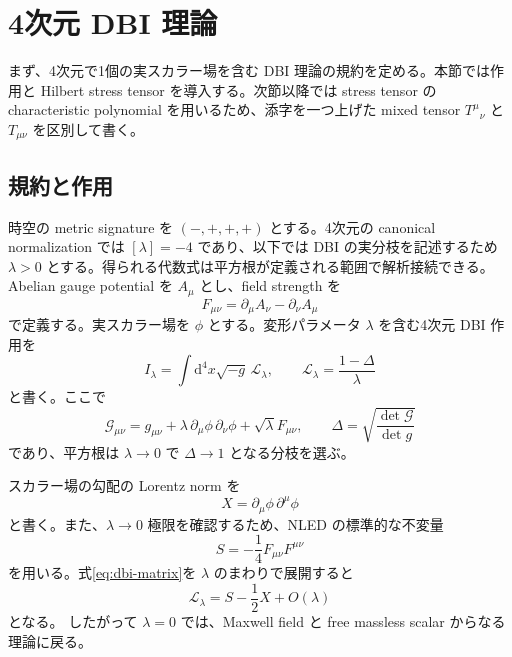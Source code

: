 \documentclass[a4paper,11pt]{ltjsarticle}
\numberwithin{equation}{section}
\newcommand{\dd}{\mathrm d}
\newcommand{\Lag}{\mathcal L}
\newcommand{\G}{\mathcal G}
\begin{document}
\section{4次元 DBI 理論}
\label{sec:dbi}

まず、4次元で1個の実スカラー場を含む DBI 理論の規約を定める。本節では作用と Hilbert stress tensor を導入する。次節以降では stress tensor の characteristic polynomial を用いるため、添字を一つ上げた mixed tensor $T^\mu{}_{\nu}$ と $T_{\mu\nu}$ を区別して書く。

\subsection{規約と作用}

時空の metric signature を $(-,+,+,+)$ とする。4次元の canonical normalization では $[\lambda]=-4$ であり、以下では DBI の実分枝を記述するため $\lambda>0$ とする。得られる代数式は平方根が定義される範囲で解析接続できる。Abelian gauge potential を $A_\mu$ とし、field strength を
\begin{equation}
 F_{\mu\nu}=\partial_\mu A_\nu-\partial_\nu A_\mu
 \label{eq:F-definition}
\end{equation}
で定義する。実スカラー場を $\phi$ とする。変形パラメータ $\lambda$ を含む4次元 DBI 作用を
\begin{equation}
 I_\lambda=\int\dd^4x\sqrt{-g}\,\Lag_\lambda,
 \qquad
 \Lag_\lambda=\frac{1-\Delta}{\lambda}
 \label{eq:action}
\end{equation}
と書く。ここで
\begin{equation}
 \G_{\mu\nu}
 =g_{\mu\nu}+\lambda\,\partial_\mu\phi\,\partial_\nu\phi
 +\sqrt\lambda F_{\mu\nu},
 \qquad
 \Delta=\sqrt{\frac{\det\G}{\det g}}
 \label{eq:dbi-matrix}
\end{equation}
であり、平方根は $\lambda\to0$ で $\Delta\to1$ となる分枝を選ぶ。

スカラー場の勾配の Lorentz norm を
\begin{equation}
 X=\partial_\mu\phi\,\partial^\mu\phi
 \label{eq:X-definition}
\end{equation}
と書く。また、$\lambda\to0$ 極限を確認するため、NLED の標準的な不変量
\begin{equation}
 S=-\frac14F_{\mu\nu}F^{\mu\nu}
 \label{eq:S-definition}
\end{equation}
を用いる。式\eqref{eq:dbi-matrix}を $\lambda$ のまわりで展開すると
\begin{equation}
 \Lag_\lambda=S-\frac12X+O(\lambda)
 \label{eq:seed}
\end{equation}
となる。
したがって $\lambda=0$ では、Maxwell field と free massless scalar からなる理論に戻る。
\end{document}
